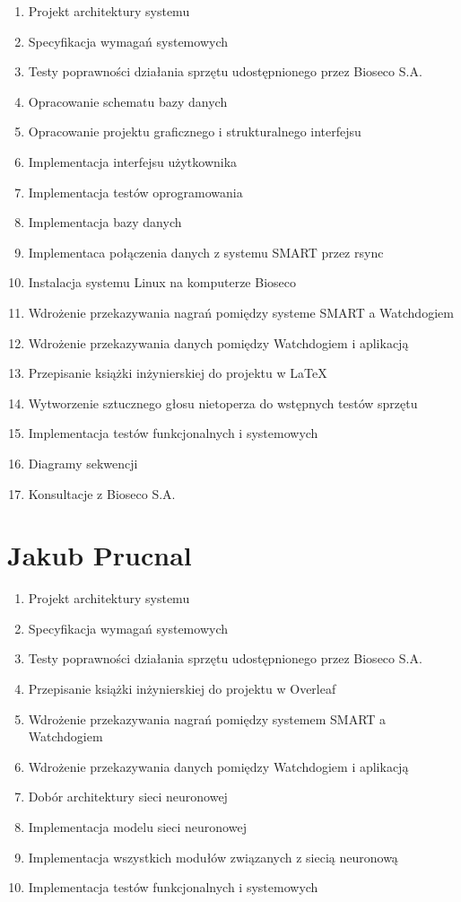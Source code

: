 \documentclass{sprz}
\begin{document}
\begin{enumerate}
  \item Projekt architektury systemu
  \item Specyfikacja wymagań systemowych
  \item Testy poprawności działania sprzętu udostępnionego przez Bioseco S.A.
  \item Opracowanie schematu bazy danych
  \item Opracowanie projektu graficznego i strukturalnego interfejsu
  \item Implementacja interfejsu użytkownika
  \item Implementacja testów oprogramowania
  \item Implementacja bazy danych
  \item Implementaca połączenia danych z systemu SMART przez rsync
  \item Instalacja systemu Linux na komputerze Bioseco
  \item Wdrożenie przekazywania nagrań pomiędzy systeme SMART a Watchdogiem
  \item Wdrożenie przekazywania danych pomiędzy Watchdogiem i aplikacją
  \item Przepisanie książki inżynierskiej do projektu w LaTeX
  \item Wytworzenie sztucznego głosu nietoperza do wstępnych testów sprzętu
  \item Implementacja testów funkcjonalnych i systemowych
  \item Diagramy sekwencji
  \item Konsultacje z Bioseco S.A.
\end{enumerate}

\section{Jakub Prucnal}
\begin{enumerate}
  \item Projekt architektury systemu
  \item Specyfikacja wymagań systemowych
  \item Testy poprawności działania sprzętu udostępnionego przez Bioseco S.A.
  \item Przepisanie książki inżynierskiej do projektu w Overleaf
  \item Wdrożenie przekazywania nagrań pomiędzy systemem SMART a Watchdogiem
  \item Wdrożenie przekazywania danych pomiędzy Watchdogiem i aplikacją
  \item Dobór architektury sieci neuronowej
  \item Implementacja modelu sieci neuronowej
  \item Implementacja wszystkich modułów związanych z siecią neuronową
  \item Implementacja testów funkcjonalnych i systemowych

\end{enumerate}
\end{document}
